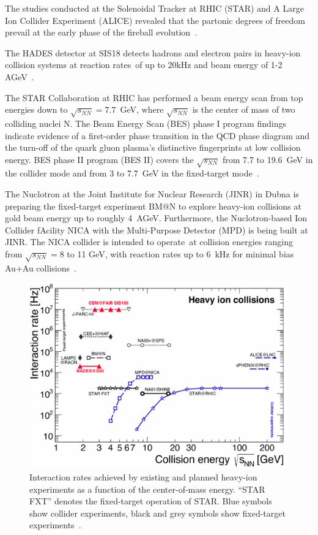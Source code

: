 The studies conducted at the Solenoidal Tracker at \gls{RHIC} (\gls{STAR}) and A Large Ion Collider Experiment (\gls{ALICE}) revealed that the partonic degrees of freedom prevail at the early phase of the fireball evolution~\cite{CBM_physics}.

The HADES detector at SIS18 detects hadrons and electron pairs in heavy-ion collision systems at reaction rates of up to 20kHz and beam energy of 1-2 AGeV~\cite{Ablyazimov_2017}.


The STAR Collaboration at \gls{RHIC} has
performed a beam energy scan from top energies down
to $\sqrt{s_{NN}} = 7.7$~GeV, where $\sqrt{s_{NN}}$ is the center of mass of two colliding nuclei N.  The Beam Energy Scan (\gls{BES}) phase I program findings indicate evidence of a first-order phase transition in the QCD phase diagram and the turn-off of the quark gluon plasma's distinctive fingerprints at low collision energy. BES phase II program (BES II) covers the $\sqrt{s_{NN}}$ from 7.7 to 19.6~GeV in the collider mode and from 3 to 7.7~GeV in the fixed-target mode~\cite{STAR2, STAR1}.

The Nuclotron at the Joint Institute for Nuclear Research (JINR) in Dubna is preparing the fixed-target experiment BM@N to explore heavy-ion collisions at gold beam energy up to roughly 4~AGeV. Furthermore, the Nuclotron-based Ion Collider fAcility NICA with the Multi-Purpose Detector (MPD) is being built at JINR. The NICA collider is intended to operate at collision energies ranging from $\sqrt{s_{NN}} = 8$ to 11 GeV, with reaction rates up to 6~kHz for minimal bias Au+Au collisions~\cite{Ablyazimov_2017}.

\begin{figure}[!h]
    \centering
    \includegraphics[width=0.7\columnwidth]{Chapter1/images/interaction_rates.png}
    \caption{Interaction rates achieved by existing and planned heavy-ion experiments as a function of the center-of-mass energy. “STAR FXT” denotes the fixed-target operation of STAR.  Blue symbols show collider experiments, black and grey symbols show fixed-target experiments~\cite{Ablyazimov_2017}.}
    \label{fig:cbm_rates}
\end{figure}




